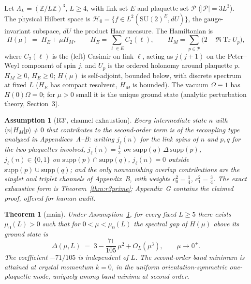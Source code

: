 \documentclass[11pt]{article}
\newtheorem{theorem}{Theorem}[section]
\newtheorem{assumption}{Assumption}
\newcommand{\Tr}{\operatorname{Tr}}
\newcommand{\G}{{\mathrm{SU}}(2)}
\begin{document}
Let $\Lambda_L=(\mathbb Z/L\mathbb Z)^3$, $L\ge 4$, with link set $E$ and
plaquette set $\mathcal P$ ($|\mathcal P|=3L^3$). The physical Hilbert space
is $\mathcal H_0=\{f\in L^2(\G^{E},dU)\}$, the gauge-invariant subspace,
$dU$ the product Haar measure. The Hamiltonian is
\begin{equation}\label{eq:H}
H(\mu)\;=\;H_E+\mu H_M,\qquad
H_E=\sum_{\ell\in E}C_2(\ell),\qquad
H_M=\sum_{p\in\mathcal P}\bigl(2-\Re\Tr U_p\bigr),
\end{equation}
where $C_2(\ell)$ is the (left) Casimir on link $\ell$, acting as $j(j+1)$ on
the Peter--Weyl component of spin $j$, and $U_p$ is the ordered holonomy
around plaquette $p$. $H_M\ge 0$, $H_E\ge 0$; $H(\mu)$ is self-adjoint,
bounded below, with discrete spectrum at fixed $L$ ($H_E$ has compact
resolvent, $H_M$ is bounded). The vacuum $\Omega\equiv 1$ has $H(0)\Omega=0$;
for $\mu>0$ small it is the unique ground state (analytic perturbation
theory, Section~3).

\begin{assumption}[R3', channel exhaustion]\label{ass:r3prime}
Every intermediate state $n$ with $\langle n|H_M|p\rangle\neq 0$ that
contributes to the second-order term is of the recoupling type analyzed in
Appendices~A--B: writing $j_\ell(n)$ for the link spins of $n$ and $p,q$ for
the two plaquettes involved, $j_\ell(n)=\tfrac12$ on
$\mathrm{supp}(q)\,\Delta\,\mathrm{supp}(p)$, $j_\ell(n)\in\{0,1\}$ on
$\mathrm{supp}(p)\cap\mathrm{supp}(q)$, $j_\ell(n)=0$ outside
$\mathrm{supp}(p)\cup\mathrm{supp}(q)$; and the only nonvanishing overlap
contributions are the singlet and triplet channels of Appendix~B, with
weights $c_0^2=\tfrac14$, $c_1^2=\tfrac34$. The exact exhaustive form is
Theorem~\ref{thm:r3prime}; Appendix~G contains the claimed proof, offered
for human audit.
\end{assumption}

\begin{theorem}[main]\label{thm:main}
Under Assumption~\ref{ass:r3prime}, for every fixed $L\ge 5$ there exists
$\mu_0(L)>0$ such that for $0<\mu<\mu_0(L)$ the spectral gap of $H(\mu)$
above its ground state is
\[
\Delta(\mu,L)\;=\;3-\frac{71}{105}\,\mu^2+O_L(\mu^3),\qquad \mu\to0^+ .
\]
The coefficient $-71/105$ is independent of $L$. The second-order band
minimum is attained at crystal momentum $k=0$, in the uniform
orientation-symmetric one-plaquette mode, uniquely among band minima at
second order.
\end{theorem}
\end{document}

